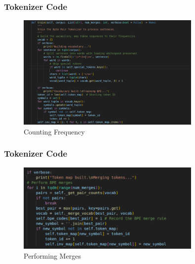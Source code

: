\documentclass[
    10pt %
    16:9, %
]{beamer}
\begin{document}
\frame
{
  \frametitle{Tokenizer Code}
  \begin{figure}
    \centering
    \includegraphics[width=0.8\textwidth]{train_tokenizer.png}
    \caption{Counting Frequency}
  \end{figure}
}

\frame
{
  \frametitle{Tokenizer Code}
  \begin{figure}
    \centering
    \includegraphics[width=0.8\textwidth]{train_tokenizer2.png}
    \caption{Performing Merges}
  \end{figure}
}
\end{document}
